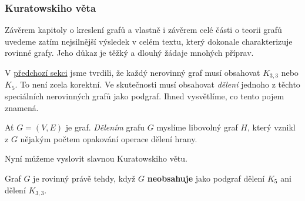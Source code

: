 \subsubsection{Kuratowskiho věta}
\label{sssec:kuratowskiho-veta}

Závěrem kapitoly o kreslení grafů a vlastně i závěrem celé části o teorii grafů
uvedeme zatím nejsilnější výsledek v celém textu, který dokonale charakterizuje
rovinné grafy. Jeho důkaz je těžký a dlouhý žádaje mnohých příprav.

V \hyperref[sssec:rovinne-grafy]{předchozí sekci} jsme tvrdili, že každý
nerovinný graf musí obsahovat $K_{3,3}$ nebo $K_5$. To není zcela korektní. Ve
skutečnosti musí obsahovat \emph{dělení} jednoho z těchto speciálních
nerovinných grafů jako podgraf. Ihned vysvětlíme,
co tento pojem znamená.

\begin{definition}
 \label{def:deleni-grafu}
 Ať $G = (V,E)$ je graf. \emph{Dělením} grafu $G$ myslíme libovolný graf $H$,
 který vznikl z $G$ nějakým počtem opakování operace dělení hrany.
\end{definition}

Nyní můžeme vyslovit slavnou Kuratowskiho větu.

\begin{theorem}[Kuratowskiho]
 \label{thm:kuratowskiho}
 Graf $G$ je rovinný právě tehdy, když $G$ \textbf{neobsahuje} jako podgraf
 dělení $K_5$ ani dělení $K_{3,3}$.
\end{theorem}

